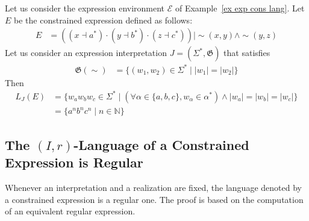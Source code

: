 \documentclass[a4paper]{llncs}
\begin{document}
    \begin{example}\label{ex anbncn}
      Let us consider the expression environment $\mathcal{E}$ of Example~\ref{ex exp cons lang}.
      Let $E$ be the constrained expression defined as follows:
      \begin{align*}
        E &= ((x\dashv a^*)\cdot (y\dashv b^*)\cdot (z\dashv c^*))\mid \sim(x,y)\wedge \sim (y,z)
      \end{align*}
      Let us consider an expression interpretation $J=(\Sigma^*,\mathfrak{G})$ that satisfies
      \begin{align*}
        \mathfrak{G}(\sim)&=\{(w_1,w_2)\in\Sigma^*\mid |w_1|=|w_2|\}
      \end{align*}
      Then
      \begin{align*}
        L_J(E) &=\{w_aw_bw_c \in\Sigma^*\mid (\forall \alpha\in\{a,b,c\}, w_\alpha\in\alpha^*) \wedge |w_a|=|w_b|=|w_c|\}\\
               &=\{a^nb^nc^n\mid n\in\mathbb{N}\}
      \end{align*}
    \end{example}

  \subsection{The $(I,r)$-Language of a Constrained Expression is Regular}
  
  Whenever an interpretation and a realization are fixed, the language denoted by a constrained expression is a regular one. The proof is based on the computation of an equivalent regular expression.
  
\end{document}
